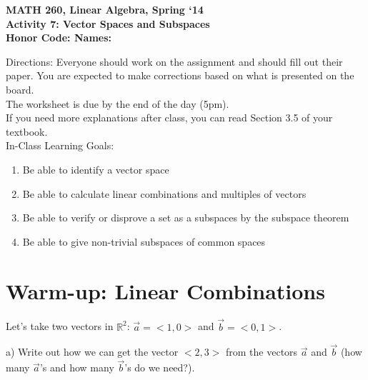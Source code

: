 \documentclass{article}
\begin{document}
\begin{flushleft}
	\bfseries{MATH 260, Linear Algebra, Spring `14}\\
	\bfseries{Activity 7:  Vector Spaces and Subspaces}\\
	\bfseries{Honor Code:} \hspace{3.5in}\bfseries{Names:}\\
\end{flushleft}
\begin{flushleft}
\vspace{.75in}
Directions:  Everyone should work on the assignment and should fill out their paper.  You are expected to make corrections based on what is presented on the board.  \\
\large The worksheet is due by the end of the day (5pm). \normalsize \\ 
If you need more explanations after class, you can read Section 3.5 of your textbook.\\
\vspace{0.1in}
\Large
In-Class Learning Goals:\\
\normalsize
\begin{enumerate}
\item Be able to identify a vector space
\item Be able to calculate linear combinations and multiples of vectors
\item Be able to verify or disprove a set as a subspaces by the subspace theorem
\item Be able to give non-trivial subspaces of common spaces
\end{enumerate}

\vspace{0.1in}

\section*{Warm-up:  Linear Combinations}

Let's take two vectors in $\mathbb{R}^2$: $\vec{a}=<1,0>$ and $\vec{b}=<0,1>$.

\vspace{0.1in}

a) Write out how we can get the vector $<2,3>$ from the vectors $\vec{a}$ and $\vec{b}$ (how many $\vec{a}$'s and how many $\vec{b}$'s do we need?).

\vspace{1.5in}


\end{flushleft}
\end{document}
